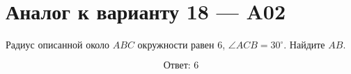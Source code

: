 


\section*{Аналог к варианту 18 — A02}
Радиус описанной около \(ABC\) окружности равен \(6\), \(\angle ACB=30^\circ\). Найдите \(AB\).
\begin{center}\end{center}
\[\boxed{\text{Ответ: }6}\]

